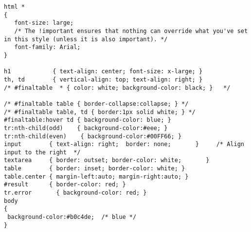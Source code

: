 \begin{verbatim}
html *
{
   font-size: large; 
   /* The !important ensures that nothing can override what you've set in this style (unless it is also important). */
   font-family: Arial;
}

h1            { text-align: center; font-size: x-large; }
th, td        { vertical-align: top; text-align: right; }   
/* #finaltable  * { color: white; background-color: black; }   */

/* #finaltable table { border-collapse:collapse; } */
/* #finaltable table, td { border:1px solid white; } */
#finaltable:hover td { background-color: blue; } 
tr:nth-child(odd)    { background-color:#eee; }
tr:nth-child(even)    { background-color:#00FF66; }
input        { text-align: right;  border: none;       }     /* Align input to the right  */
textarea     { border: outset; border-color: white;       }                        
table        { border: inset; border-color: white; }
table.center { margin-left:auto; margin-right:auto; }
#result      { border-color: red; }
tr.error       { background-color: red; }
body
{
 background-color:#b0c4de;  /* blue */
}
\end{verbatim}

